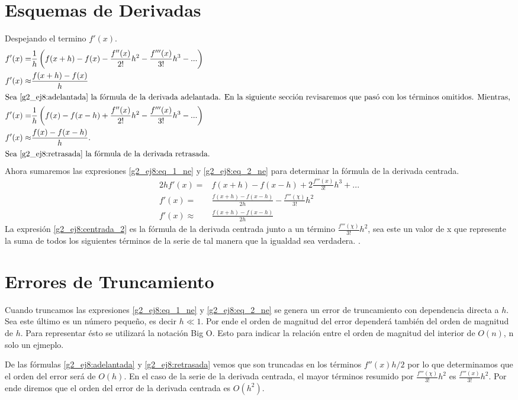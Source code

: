 \documentclass[../portafolio.tex]{subfiles}
\begin{document}
\section{Esquemas de Derivadas}
Despejando el termino $f'(x)$.
\begin{align}
f'(x)=&\frac{1}{h}\left( f(x+h) - f(x) - \frac{f''(x)}{2!}h^2 -\frac{f'''(x)}{3!}h^3-... \right)\label{g2_ej8:eq_1_ne}\\
f'(x)\approx& \frac{f(x+h)-f(x)}{h} \label{g2_ej8:adelantada}\\ \intertext{Sea \eqref{g2_ej8:adelantada} la fórmula de la derivada adelantada. En la siguiente sección revisaremos que pasó con los términos omitidos. Mientras, }
f'(x)=&\frac{1}{h}\left( f(x) - f(x-h) + \frac{f''(x)}{2!}h^2 -\frac{f'''(x)}{3!}h^3-... \right) \label{g2_ej8:eq_2_ne} \\
f'(x)\approx &\frac{f(x)-f(x-h)}{h}.\label{g2_ej8:retrasada} \\ \intertext{Sea \eqref{g2_ej8:retrasada} la fórmula de la derivada retrasada. }
\end{align}
Ahora sumaremos las expresiones \eqref{g2_ej8:eq_1_ne} y \eqref{g2_ej8:eq_2_ne} para determinar la fórmula de la derivada centrada.
\begin{align}
2h f'(x)=& f(x+h) -f(x-h) +2 \frac{f'''(x)}{3!}h^3 +...\\
f'(x)=& \frac{f(x+h)-f(x-h)}{2h}- \frac{f'''(\chi)}{3!}h^2 \label{g2_ej8:centrada_2}\\
f'(x)\approx& \frac{f(x+h)-f(x-h)}{2h}
\end{align}
La expresión \eqref{g2_ej8:centrada_2} es la fórmula de la derivada centrada junto a un término $\frac{f'''(\chi)}{3!}h^2$, sea este un valor de x que represente la suma de todos los siguientes términos de la serie de tal manera que la igualdad sea verdadera. \citep{navarro2024errores}. 
\section{Errores de Truncamiento}
Cuando truncamos las expresiones \eqref{g2_ej8:eq_1_ne} y \eqref{g2_ej8:eq_2_ne} se genera un error de truncamiento con dependencia directa a $h$.
Sea este último es un número pequeño, es decir $h\ll 1$. Por ende el orden de magnitud del error dependerá también del orden de magnitud de $h$. Para representar ésto se utilizará la notación Big O. Esto para indicar la relación entre el orden de magnitud del interior de $O(n)$, n solo un ejmeplo.

De las fórmulas \eqref{g2_ej8:adelantada} y \eqref{g2_ej8:retrasada} vemos que son truncadas en los términos $f''(x)h/2$ por lo que determinamos que el orden del error será de $O(h)$.
En el caso de la serie de la derivada centrada, el mayor términos resumido por $\frac{f'''(\chi)}{3!}h^2$ es $\frac{f'''(x)}{3!}h^2$. Por ende diremos que el orden del error de la derivada centrada es $O(h^2)$.
\end{document}
